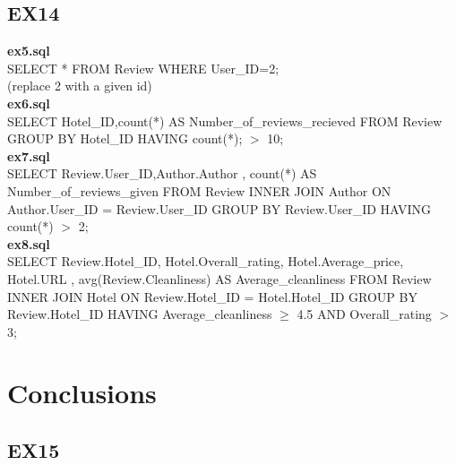 \documentclass{article}
\begin{document}
	\subsection{EX14}
	\textbf{ex5.sql} \\
	SELECT  * FROM Review WHERE User\_ID=2;
	\\
	(replace 2 with a given id)
	\\
	\textbf{ex6.sql} \\
	SELECT Hotel\_ID,count(*) AS Number\_of\_reviews\_recieved
	FROM Review
	GROUP BY Hotel\_ID HAVING count(*); 
	\begin{math}
	>
	\end{math} 
	10;
	\\
	\textbf{ex7.sql} \\
	SELECT Review.User\_ID,Author.Author , count(*) AS Number\_of\_reviews\_given
	FROM Review INNER JOIN Author ON Author.User\_ID = Review.User\_ID 
	GROUP BY Review.User\_ID HAVING count(*) 
	\begin{math}
	>
	\end{math} 
	2;
	\\
	\textbf{ex8.sql} \\
	SELECT Review.Hotel\_ID, Hotel.Overall\_rating, Hotel.Average\_price, Hotel.URL , avg(Review.Cleanliness) AS Average\_cleanliness
	FROM Review INNER JOIN Hotel ON Review.Hotel\_ID = Hotel.Hotel\_ID 
	GROUP BY Review.Hotel\_ID HAVING Average\_cleanliness 
	\begin{math}
	\geq
	\end{math}
	 4.5 AND Overall\_rating 
	 \begin{math}
	 >
	 \end{math}
	 3;
	
	\section{Conclusions}
	
	\subsection{EX15}
	
\end{document}
